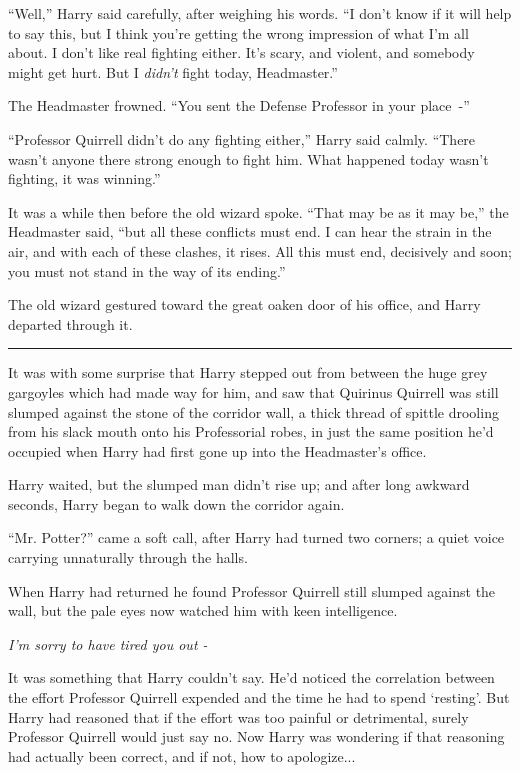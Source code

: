 ``Well,'' Harry said carefully, after weighing his words. ``I don't know if it will help to say this, but I think you're getting the wrong impression of what I'm all about. I don't like real fighting either. It's scary, and violent, and somebody might get hurt. But I \emph{didn't} fight today, Headmaster.''

The Headmaster frowned. ``You sent the Defense Professor in your place~-''

``Professor Quirrell didn't do any fighting either,'' Harry said calmly. ``There wasn't anyone there strong enough to fight him. What happened today wasn't fighting, it was winning.''

It was a while then before the old wizard spoke. ``That may be as it may be,'' the Headmaster said, ``but all these conflicts must end. I can hear the strain in the air, and with each of these clashes, it rises. All this must end, decisively and soon; you must not stand in the way of its ending.''

The old wizard gestured toward the great oaken door of his office, and Harry departed through it.

\begin{center}\rule{3in}{0.4pt}\end{center}

It was with some surprise that Harry stepped out from between the huge grey gargoyles which had made way for him, and saw that Quirinus Quirrell was still slumped against the stone of the corridor wall, a thick thread of spittle drooling from his slack mouth onto his Professorial robes, in just the same position he'd occupied when Harry had first gone up into the Headmaster's office.

Harry waited, but the slumped man didn't rise up; and after long awkward seconds, Harry began to walk down the corridor again.

``Mr. Potter?'' came a soft call, after Harry had turned two corners; a quiet voice carrying unnaturally through the halls.

When Harry had returned he found Professor Quirrell still slumped against the wall, but the pale eyes now watched him with keen intelligence.

\emph{I'm sorry to have tired you out -}

It was something that Harry couldn't say. He'd noticed the correlation between the effort Professor Quirrell expended and the time he had to spend `resting'. But Harry had reasoned that if the effort was too painful or detrimental, surely Professor Quirrell would just say no. Now Harry was wondering if that reasoning had actually been correct, and if not, how to apologize...

